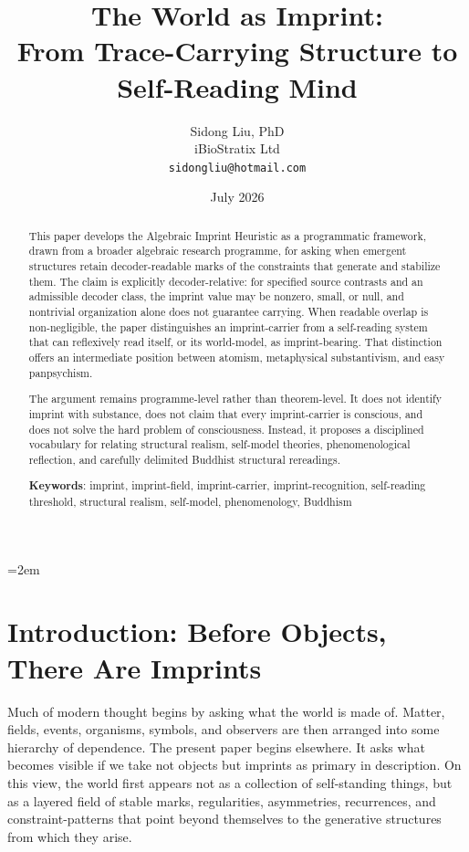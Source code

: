 \documentclass[12pt,a4paper]{article}
\title{The World as Imprint:\\
From Trace-Carrying Structure to Self-Reading Mind}
\author{
  Sidong Liu, PhD \\
  iBioStratix Ltd \\
  \texttt{sidongliu@hotmail.com}
}
\date{July 2026}
\begin{document}
\emergencystretch=2em
\raggedbottom
{}

\maketitle

\begin{abstract}
This paper develops the Algebraic Imprint Heuristic as a programmatic framework, drawn from a broader algebraic research programme, for asking when emergent structures retain decoder-readable marks of the constraints that generate and stabilize them. The claim is explicitly decoder-relative: for specified source contrasts and an admissible decoder class, the imprint value may be nonzero, small, or null, and nontrivial organization alone does not guarantee carrying. When readable overlap is non-negligible, the paper distinguishes an imprint-carrier from a self-reading system that can reflexively read itself, or its world-model, as imprint-bearing. That distinction offers an intermediate position between atomism, metaphysical substantivism, and easy panpsychism.

The argument remains programme-level rather than theorem-level. It does not identify imprint with substance, does not claim that every imprint-carrier is conscious, and does not solve the hard problem of consciousness. Instead, it proposes a disciplined vocabulary for relating structural realism, self-model theories, phenomenological reflection, and carefully delimited Buddhist structural rereadings.

\medskip

\noindent\textbf{Keywords}: imprint, imprint-field, imprint-carrier, imprint-recognition, self-reading threshold, structural realism, self-model, phenomenology, Buddhism
\end{abstract}

\section{Introduction: Before Objects, There Are Imprints}

Much of modern thought begins by asking what the world is made of. Matter, fields, events, organisms, symbols, and observers are then arranged into some hierarchy of dependence. The present paper begins elsewhere. It asks what becomes visible if we take not objects but imprints as primary in description. On this view, the world first appears not as a collection of self-standing things, but as a layered field of stable marks, regularities, asymmetries, recurrences, and constraint-patterns that point beyond themselves to the generative structures from which they arise.
\end{document}
